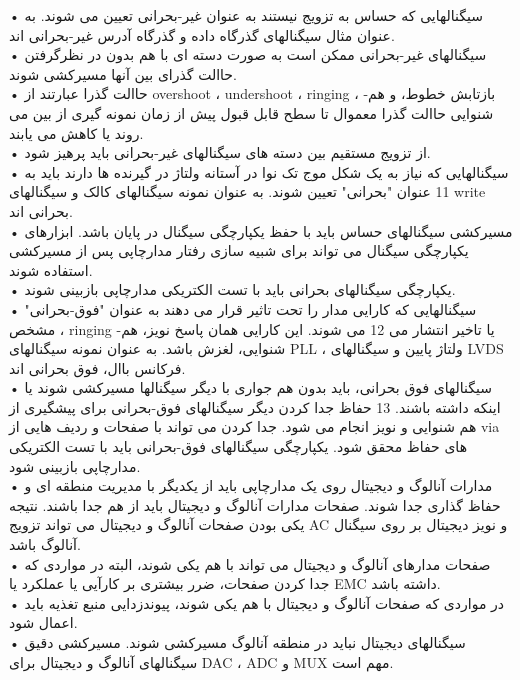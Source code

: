• سیگنالهایی که حساس به تزویج نیستند به عنوان غیر-بحرانی تعیین می شوند. به عنوان
مثال سیگنالهای گذرگاه داده و گذرگاه آدرس غیر-بحرانی اند.\\
• سیگنالهای غیر-بحرانی ممکن است به صورت دسته ای با هم بدون در نظرگرفتن حاالت
گذرای بین آنها مسیرکشی شوند.\\
• حاالت گذرا عبارتند از overshoot ، undershoot ، ringing ، بازتابش خطوط، و هم-شنوایی
حاالت گذرا معموال تا سطح قابل قبول پیش از زمان نمونه گیری از بین می روند یا کاهش
می یابند.\\
• از تزویج مستقیم بین دسته های سیگنالهای غیر-بحرانی باید پرهیز شود.\\
• سیگنالهایی که نیاز به یک شکل موج تک نوا
در آستانه ولتاژ در گیرنده ها دارند باید به 11
عنوان "بحرانی" تعیین شوند.
به عنوان نمونه سیگنالهای کالک و سیگنالهای write بحرانی اند.\\
• مسیرکشی سیگنالهای حساس باید با حفظ یکپارچگی سیگنال در پایان باشد.
ابزارهای یکپارچگی سیگنال می تواند برای شبیه سازی رفتار مدارچاپی پس از مسیرکشی
استفاده شوند.\\
• یکپارچگی سیگنالهای بحرانی باید با تست الکتریکی مدارچاپی بازبینی شوند.\\
• سیگنالهایی که کارایی مدار را تحت تاثیر قرار می دهند به عنوان "فوق-بحرانی" مشخص
، ringing یا تاخیر انتشار می 12 می شوند. این کارایی همان پاسخ نویز، هم-شنوایی، لغزش
باشد.
به عنوان نمونه سیگنالهای PLL ، ولتاژ پایین و سیگنالهای LVDS فرکانس باال، فوق بحرانی اند.\\
• سیگنالهای فوق بحرانی، باید بدون هم جواری با دیگر سیگنالها مسیرکشی شوند یا اینکه
داشته باشند. 13 حفاظ
جدا کردن دیگر سیگنالهای فوق-بحرانی برای پیشگیری از هم شنوایی و نویز انجام می شود.
جدا کردن می تواند با صفحات و ردیف هایی از via های حفاظ محقق شود.
یکپارچگی سیگنالهای فوق-بحرانی باید با تست الکتریکی مدارچاپی بازبینی شود.\\
• مدارات آنالوگ و دیجیتال روی یک مدارچاپی باید از یکدیگر با مدیریت منطقه ای و
حفاظ گذاری جدا شوند.
صفحات مدارات آنالوگ و دیجیتال باید از هم جدا باشند.
نتیجه یکی بودن صفحات آنالوگ و دیجیتال می تواند تزویج AC و نویز دیجیتال بر روی
سیگنال آنالوگ باشد.\\
• صفحات مدارهای آنالوگ و دیجیتال می تواند با هم یکی شوند، البته در مواردی که جدا
کردن صفحات، ضرر بیشتری بر کارآیی یا عملکرد یا EMC داشته باشد.\\
• در مواردی که صفحات آنالوگ و دیجیتال با هم یکی شوند، پیوندزدایی
منبع تغذیه باید
اعمال شود.\\
• سیگنالهای دیجیتال نباید در منطقه آنالوگ مسیرکشی شوند.
مسیرکشی دقیق سیگنالهای آنالوگ و دیجیتال برای DAC ، ADC و MUX مهم است. 

